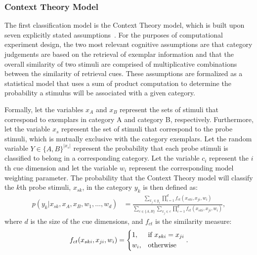 \documentclass{article}
\begin{document}
\subsubsection{Context Theory Model}

The first classification model is the Context Theory model, which is built upon seven explicitly stated assumptions~\cite{medin78:pr}. For the purposes of computational experiment design, the two most relevant cognitive assumptions are that category judgements are based on the retrieval of exemplar information and that the overall similarity of two stimuli are comprised of multiplicative combinations between the similarity of retrieval cues. These assumptions are formalized as a statistical model that uses a sum of product computation to determine the probability a stimulus will be associated with a given category.

Formally, let the variables $x_A$ and $x_B$ represent the sets of stimuli that correspond to exemplars in category A and category B, respectively. Furthermore, let the variable $x_s$ represent the set of stimuli that correspond to the probe stimuli, which is mutually exclusive with the category exemplars. Let the random variable $Y \in \{A,B\}^{|x_s|}$ represent the probability that each probe stimuli is classified to belong in a corresponding category. Let the variable $c_i$ represent the $i$th cue dimension and let the variable $w_i$ represent the corresponding model weighting parameter. The probability that the Context Theory model will classify the $k$th probe stimuli, $x_{sk}$, in the category $y_k$ is then defined as:
\begin{align}
    p(y_k | x_{sk}, x_A, x_B, w_1, \dots, w_d) &= \frac{\sum\limits_{x_j \in y_1} \prod\limits_{i=1}^d f_{ct}(x_{ski}, x_{ji}, w_i)}{\sum\limits_{c \in \{A,B\}}\sum\limits_{x_j \in c} \prod\limits_{i=1}^d f_{ct}(x_{ski}, x_{ji}, w_i)}, \label{eq:ct_base}
\end{align}
where $d$ is the size of the cue dimensions, and $f_{ct}$ is the similarity measure:
\begin{align}
    f_{ct}(x_{ski}, x_{ji}, w_i) = 
        \begin{dcases}
            1  , & \text{if } x_{ski} = x_{ji}\\
            w_i, & \text{otherwise}
        \end{dcases}.
\end{align}
\end{document}
